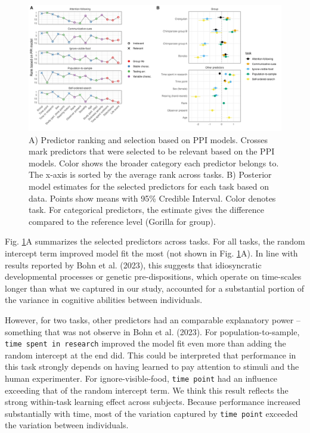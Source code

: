 \documentclass[
  man,floatsintext]{apa6}
\begin{document}
\begin{figure}

{\centering \includegraphics[width=1\linewidth]{../visuals/pred_sum} 

}

\caption{A) Predictor ranking and selection based on PPI models. Crosses mark predictors that were selected to be relevant based on the PPI models. Color shows the broader category each predictor belongs to. The x-axis is sorted by the average rank across tasks. B) Posterior model estimates for the selected predictors for each task based on data. Points show means with 95\% Credible Interval. Color denotes task. For categorical predictors, the estimate gives the difference compared to the reference level (Gorilla for group).}\label{fig:figpred}
\end{figure}

Fig. \ref{fig:figpred}A summarizes the selected predictors across tasks. For all tasks, the random intercept term improved model fit the most (not shown in Fig. \ref{fig:figpred}A). In line with results reported by Bohn et al. (2023), this suggests that idiosyncratic developmental processes or genetic pre-dispositions, which operate on time-scales longer than what we captured in our study, accounted for a substantial portion of the variance in cognitive abilities between individuals.

However, for two tasks, other predictors had an comparable explanatory power -- something that was not observe in Bohn et al. (2023). For population-to-sample, \texttt{time\ spent\ in\ research} improved the model fit even more than adding the random intercept at the end did. This could be interpreted that performance in this task strongly depends on having learned to pay attention to stimuli and the human experimenter. For ignore-visible-food, \texttt{time\ point} had an influence exceeding that of the random intercept term. We think this result reflects the strong within-task learning effect across subjects. Because performance increased substantially with time, most of the variation captured by \texttt{time\ point} exceeded the variation between individuals.
\end{document}
